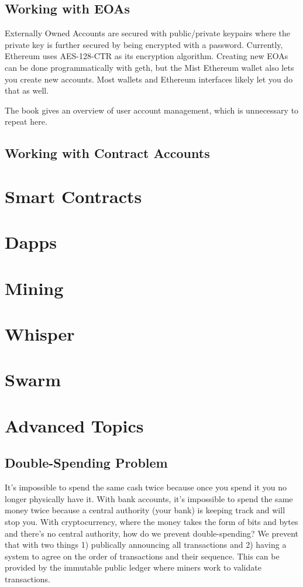 \documentclass{article}
\begin{document}
\subsection{Working with EOAs}
Externally Owned Accounts are secured with public/private keypairs where the private key is further secured by being encrypted with a password. Currently, Ethereum uses AES-128-CTR as its encryption algorithm. Creating new EOAs can be done programmatically with geth, but the Mist Ethereum wallet also lets you create new accounts. Most wallets and Ethereum interfaces likely let you do that as well.

The book gives an overview of user account management, which is unnecessary to repeat here.

\subsection{Working with Contract Accounts}

\section{Smart Contracts}

\section{Dapps}

\section{Mining}

\section{Whisper}

\section{Swarm}

\section{Advanced Topics}

\subsection{Double-Spending Problem}
It's impossible to spend the same cash twice because once you spend it you no longer physically have it. With bank accounts, it's impossible to spend the same money twice because a central authority (your bank) is keeping track and will stop you. With
cryptocurrency, where the money takes the form of bits and bytes and there's no central authority, how do we prevent double-spending? We prevent that with two things 1) publically announcing all transactions and 2) having a system to agree on the order
of transactions and their sequence. This can be provided by the immutable public ledger where miners work to validate transactions.
\end{document}
